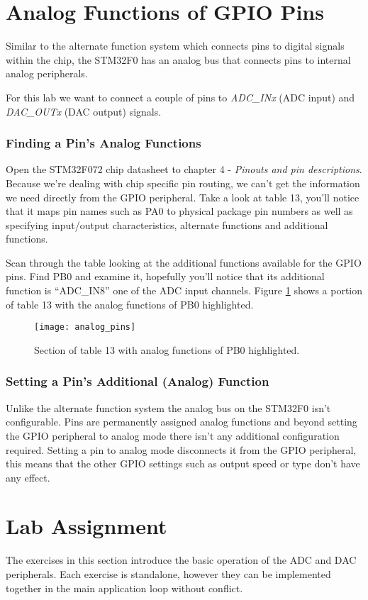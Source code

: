 \documentclass[openany,11pt,fleqn]{book} %
\begin{document}
\section{Analog Functions of GPIO Pins}
Similar to the alternate function system which connects pins to digital signals within the chip, the STM32F0 has an analog bus that connects pins to internal analog peripherals. 

For this lab we want to connect a couple of pins to \textit{ADC\_INx} (ADC input) and \textit{DAC\_OUTx} (DAC output) signals. 

\subsubsection{Finding a Pin's Analog Functions}
Open the STM32F072 chip datasheet to chapter 4 - \textit{Pinouts and pin descriptions}. Because we're dealing with chip specific pin routing, we can't get the information we need directly from the GPIO peripheral. Take a look at table 13, you'll notice that it maps pin names such as PA0 to physical package pin numbers as well as specifying input/output characteristics, alternate functions and additional functions.

Scan through the table looking at the additional functions available for the GPIO pins. Find PB0 and examine it, hopefully you'll notice that its additional function is ``ADC\_IN8'' one of the ADC input channels. Figure \ref{analog_pins} shows a portion of table 13 with the analog functions of PB0 highlighted.

\begin{figure}[]
    \centering\texttt{[image: analog\_pins]}
    \caption{Section of table 13 with analog functions of PB0 highlighted.}
    \label{analog_pins}
\end{figure}

\subsubsection{Setting a Pin's Additional (Analog) Function}
Unlike the alternate function system the analog bus on the STM32F0 isn't configurable. Pins are permanently assigned analog functions and beyond setting the GPIO peripheral to analog mode there isn't any additional configuration required. Setting a pin to analog mode disconnects it from the GPIO peripheral, this means that the other GPIO settings such as output speed or type don't have any effect.

\section{Lab Assignment}
The exercises in this section introduce the basic operation of the ADC and DAC peripherals. Each exercise is standalone, however they can be implemented together in the main application loop without conflict. 
\end{document}
